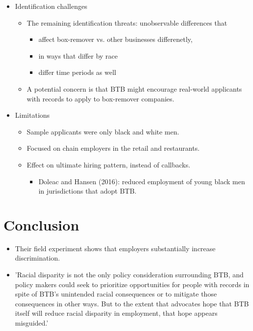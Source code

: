 \documentclass[../root]{subfiles}
\begin{document}
    \begin{itemize}
      \item Identification challenges
      \begin{itemize}
        \item The remaining identification threats: unobservable differences that
        \begin{itemize}
          \item affect box-remover vs. other businesses differenetly,
          \item in ways that differ by race
          \item differ time periods as well
        \end{itemize}
        \item A potential concern is that BTB might encourage real-world applicants with records to apply to box-remover companies.
      \end{itemize}
      \item Limitations
      \begin{itemize}
        \item Sample applicants were only black and white men.
        \item Focused on chain employers in the retail and restaurants.
        \item Effect on ultimate hiring pattern, instead of callbacks.
        \begin{itemize}
          \item Doleac and Hansen (2016): reduced employment of young black men in jurisdictions that adopt BTB.
        \end{itemize}
      \end{itemize}
    \end{itemize}


    \section{Conclusion}

    \begin{itemize}
      \item Their field experiment shows that employers substantially increase discrimination.
      \item 'Racial disparity is not the only policy consideration surrounding BTB, and policy makers could seek to prioritize opportunities for people with records in spite of BTB's unintended racial consequences or to mitigate those consequences in other ways. But to the extent that advocates hope that BTB itself will reduce racial disparity in employment, that hope appears misguided.'
    \end{itemize}






    \biblio
\end{document}

